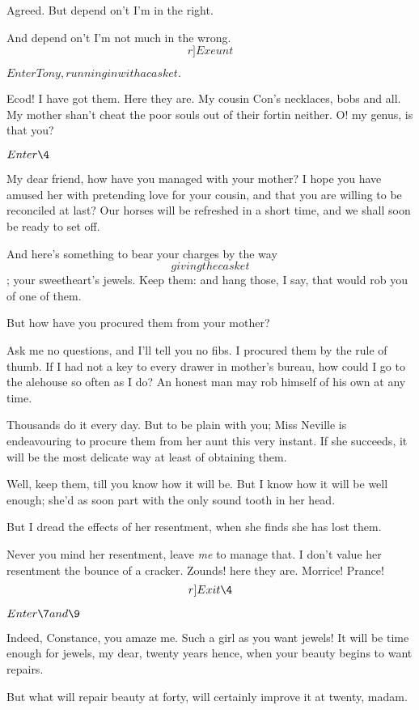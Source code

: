 \documentclass{book}
\begin{document}
\3  Agreed.  But depend on't I'm in the right.

\8  And depend on't I'm not much in the wrong. 
\[r]Exeunt\]


\(Enter Tony, running in with a casket.\)


\5  Ecod! I have got them.  Here they are.  My cousin Con's
necklaces, bobs and all.  My mother shan't cheat the poor souls out of
their fortin neither.  O! my genus, is that you?


\(Enter \4\)


\4  My dear friend, how have you managed with your mother?  I
hope you have amused her with pretending love for your cousin, and that
you are willing to be reconciled at last?  Our horses will be refreshed
in a short time, and we shall soon be ready to set off.

\5  And here's something to bear your charges by the way \[giving the
casket\]; your sweetheart's jewels.  Keep them: and hang those, I say,
that would rob you of one of them.

\4  But how have you procured them from your mother?

\5  Ask me no questions, and I'll tell you no fibs.  I procured them
by the rule of thumb.  If I had not a key to every drawer in mother's
bureau, how could I go to the alehouse so often as I do?  An honest man
may rob himself of his own at any time.

\4  Thousands do it every day.  But to be plain with you; Miss
Neville is endeavouring to procure them from her aunt this very
instant.  If she succeeds, it will be the most delicate way at least of
obtaining them.

\5  Well, keep them, till you know how it will be.  But I know how
it will be well enough; she'd as soon part with the only sound tooth in
her head.

\4  But I dread the effects of her resentment, when she finds
she has lost them.

\5  Never you mind her resentment, leave \textit{me} to manage that.  I
don't value her resentment the bounce of a cracker.  Zounds! here they
are.  Morrice! Prance!  \[r]Exit \4\]


\(Enter \7 and \9\)


\7  Indeed, Constance, you amaze me.  Such a girl as you
want jewels!  It will be time enough for jewels, my dear, twenty years
hence, when your beauty begins to want repairs.

\9  But what will repair beauty at forty, will certainly
improve it at twenty, madam.
\end{document}
